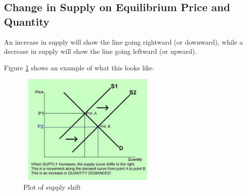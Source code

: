 \documentclass[a4paper, 12pt] {article}
\begin{document}
\subsection{Change in Supply on Equilibrium Price and Quantity}
An increase in supply will show the line going rightward (or downward), while
a decrease in supply will show the line going leftward (or upward).

Figure \ref{fig:supply_shift} shows an example of what this looks like.
\begin{figure}[h]
    \centering
    \includegraphics[height=5.5cm, width=7.0cm]{supply_shift.jpg}
    \caption{Plot of supply shift}
    \label{fig:supply_shift}
\end{figure}
\end{document}
